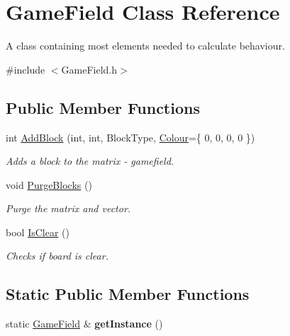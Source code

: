 \hypertarget{class_game_field}{}\section{Game\+Field Class Reference}
\label{class_game_field}


A class containing most elements needed to calculate behaviour.  




{\ttfamily \#include $<$Game\+Field.\+h$>$}

\subsection*{Public Member Functions}
\begin{DoxyCompactItemize}
\item 
int \hyperlink{class_game_field_ac5ab828d2d8dbabc75dedfc8f699a42c}{Add\+Block} (int, int, Block\+Type, \hyperlink{struct_colour}{Colour}=\{ 0, 0, 0, 0 \})
\begin{DoxyCompactList}\small\item\em Adds a block to the matrix -\/ gamefield. \end{DoxyCompactList}\item 
\mbox{\label{class_game_field_a507ffac780fc8775a56e5e7af44c8960}} 
void \hyperlink{class_game_field_a507ffac780fc8775a56e5e7af44c8960}{Purge\+Blocks} ()
\begin{DoxyCompactList}\small\item\em Purge the matrix and vector. \end{DoxyCompactList}\item 
\mbox{\label{class_game_field_ad408237f35b181d21dd5fa1b473c8ca8}} 
bool \hyperlink{class_game_field_ad408237f35b181d21dd5fa1b473c8ca8}{Is\+Clear} ()
\begin{DoxyCompactList}\small\item\em Checks if board is clear. \end{DoxyCompactList}\end{DoxyCompactItemize}
\subsection*{Static Public Member Functions}
\begin{DoxyCompactItemize}
\item 
\mbox{\label{class_game_field_ad487d606fc86f967f58ec65d85684058}} 
static \hyperlink{class_game_field}{Game\+Field} \& {\bfseries get\+Instance} ()
\end{DoxyCompactItemize}
